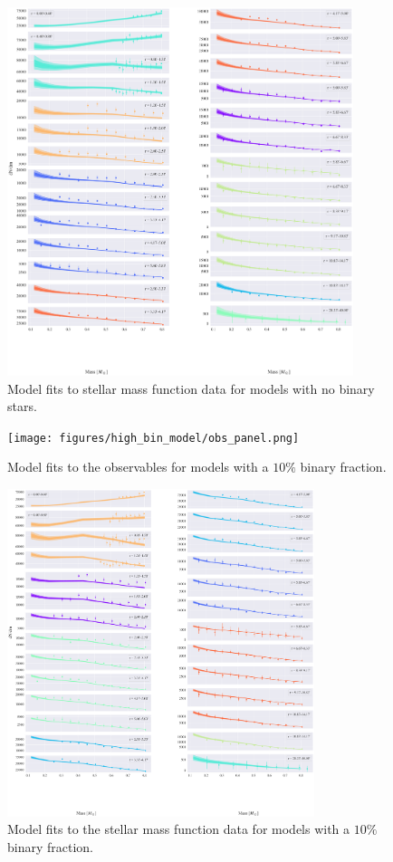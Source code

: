 \begin{figure}
	\begin{center}
		\includegraphics[width=0.9\textwidth]{figures/prev_nobin/mass_fun.png}
	\end{center}
	\caption{Model fits to stellar mass function data for models with no binary stars.}
	\label{fig:nobin_mass_fun}
\end{figure}

\begin{figure}
	\centering
	\texttt{[image: figures/high\_bin\_model/obs\_panel.png]}
	\caption{Model fits to the observables for models with a $10\%$ binary fraction.}
	\label{fig:highbin_obs_panel}
\end{figure}


\begin{figure}
	\centering
	\includegraphics[width=0.8\textwidth]{figures/high_bin_model/mass_fun.png}
	\caption{Model fits to the stellar mass function data for models with a $10\%$ binary fraction.}
	\label{fig:highbin_mass_fun}
\end{figure}